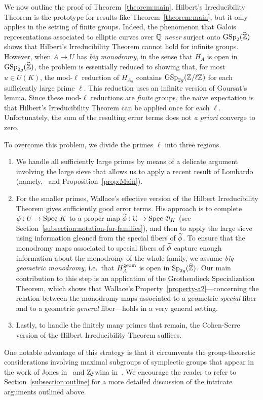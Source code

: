 We now outline the proof of Theorem~\ref{theorem:main}. Hilbert's Irreducibility Theorem is the prototype for results like Theorem~\ref{theorem:main}, but it only applies in the setting of finite groups. Indeed, the phenomenon that Galois representations associated to elliptic curves over ${\mathbb Q}$ \emph{never} surject onto $\operatorname{GSp}_2(\widehat{\mathbb Z})$ shows that Hilbert's Irreducibility Theorem cannot hold for infinite groups. However, when $A \to U$ has \emph{big monodromy}, in the sense that $H_A$ is open in $\operatorname{GSp}_{2g}(\widehat{{\mathbb Z}})$, the problem is essentially reduced to showing that, for most $u \in U(K)$, the mod-$\ell$ reduction of $H_{A_u}$ contains $\operatorname{GSp}_{2g}({\mathbb Z} / \ell {\mathbb Z})$ for each sufficiently large prime $\ell$. This reduction uses an infinite version of Goursat's lemma. Since these mod-$\ell$ reductions are \emph{finite} groups, the na\"{i}ve expectation is that Hilbert's Irreducibility Theorem can be applied once for each $\ell$. Unfortunately, the sum of the resulting error terms does not \emph{a priori} converge to zero.

To overcome this problem, we divide the primes $\ell$ into three regions.
\begin{enumerate}
	\item We handle all sufficiently large primes by means of a delicate argument involving the large sieve that allows us to apply a recent result of Lombardo (namely,~\cite[Theorem 1.2]{lombardo2015explicit} and  Proposition~\ref{prop:Main}).
	\item For the smaller primes, Wallace's effective version of the Hilbert Irreducibility Theorem gives sufficiently good error terms. His approach is to complete $\phi: U \to \text{Spec } K$ to a proper map $\widetilde{\phi} : \mathcal{U} \to \text{Spec } \mathcal{O}_K$ (see Section~\ref{subsection:notation-for-families}), and then to apply the large sieve using information gleaned from the special fibers of $\widetilde{\phi}$. To ensure that the monodromy maps associated to special fibers of $\widetilde{\phi}$ capture enough information about the monodromy of the whole family, we assume \emph{big geometric monodromy}, i.e.\ that $H_A^{\operatorname{geom}}$ is open in $\operatorname{Sp}_{2g}(\widehat{{\mathbb Z}})$. Our main contribution to this step is an application of the Grothendieck Specialization Theorem, which shows that Wallace's Property~\ref{property-a2}---concerning the relation between the monodromy maps associated to a geometric \emph{special} fiber and to a geometric \emph{general} fiber---holds in a very general setting.
	\item Lastly, to handle the finitely many primes that remain, the Cohen-Serre version of the Hilbert Irreducibility Theorem suffices.
\end{enumerate}
One notable advantage of this strategy is that it circumvents the group-theoretic considerations involving maximal subgroups of symplectic groups that appear in the work of Jones in~\cite{josofabank} and Zywina in~\cite{zywina2010hilbert}. We encourage the reader to refer to Section~\ref{subsection:outline} for a more detailed discussion of the intricate arguments outlined above.

